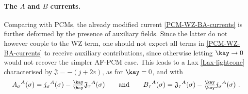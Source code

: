 \documentclass[12pt]{article}
\numberwithin{equation}{section}
\begin{document}
\paragraph{The $A$ and $B$ currents.} Comparing with PCMs, the already modified current \eqref{PCM-WZ-BA-currents} is further deformed by the presence of auxiliary fields. Since the latter do not however couple to the WZ term, one should not expect all terms in \eqref{PCM-WZ-BA-currents} to receive auxiliary contributions, since otherwise letting $\kay\rightarrow0$ would not recover the simpler AF-PCM case. This leads to a Lax \eqref{Lax-lightcone} characterised by $\mathfrak{J}=-(j+2v)$, as for $\kay=0$, and with
\begin{equation}\label{AFPCM-WZ-BA-currents}
A_{\sigma}{}^{A}(\sigma)=j_{\sigma}{}^{A}(\sigma)-\tfrac{\kay}{\hay}\mathfrak{J}_{\tau}{}^{A}(\sigma)
\qquad \text{and} \qquad 
B_{\tau}{}^{A}(\sigma)=\mathfrak{J}_{\tau}{}^{A}(\sigma)-\tfrac{\kay}{\hay}j_{\sigma}{}^{A}(\sigma)  \,\, .
\end{equation}
\end{document}
